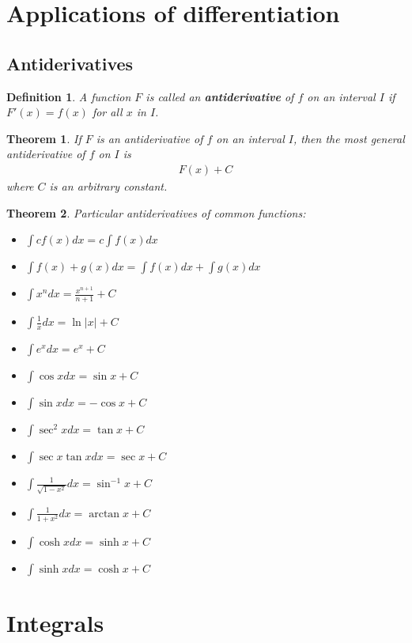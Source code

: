 \documentclass{article}
\theoremstyle{sltheorem}
\newtheorem{definition}{Definition}[section]
\newtheorem{theorem}{Theorem}[section]
\begin{document}
\tableofcontents
\setcounter{section}{3}
\section{Applications of differentiation}
\setcounter{subsection}{6}
\subsection{Antiderivatives}
\begin{definition}
    A function $F$ is called an \textbf{antiderivative} of $f$ on an interval $I$ if $F'(x)=f(x)$ for all $x$ in $I$.
\end{definition}
\begin{theorem}
    If $F$ is an antiderivative of $f$ on an interval $I$, then the most general antiderivative of $f$ on $I$ is
    \begin{align*}
        F(x) + C
    \end{align*}
    where $C$ is an arbitrary constant.
\end{theorem}
\begin{theorem}
    Particular antiderivatives of common functions:
    \begin{itemize}
        \item $\int cf(x)dx = c\int f(x)dx$
        \item $\int f(x) + g(x) dx = \int f(x)dx + \int g(x)dx$
        \item $\int x^n dx=\frac{x^{n+1}}{n+1}+C$
        \item $\int \frac{1}{x}dx=\ln |x|+C$
        \item $\int e^xdx=e^x+C$
        \item $\int \cos x dx = \sin x+C$
        \item $\int \sin x dx = -\cos x +C $
        \item $\int \sec^2 x dx = \tan x + C$
        \item $\int \sec x \tan x dx = \sec x + C$
        \item $\int \frac{1}{\sqrt{1-x^2}}dx = \sin^{-1} x + C$
        \item $\int \frac{1}{1+x^2}dx = \arctan x + C$
        \item $\int \cosh x dx = \sinh x + C$
        \item $\int \sinh x dx = \cosh x + C$
    \end{itemize}
\end{theorem}
\section{Integrals}
\end{document}
